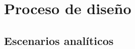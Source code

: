 \section{Proceso de diseño}
\label{chapter:proceso-diseño}

\tinylipsum

\subsection{Escenarios analíticos}

\tinylipsum
